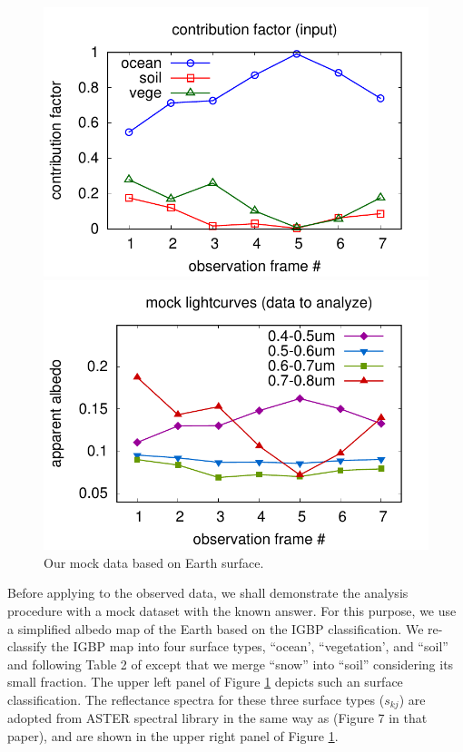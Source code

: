 \documentclass[iop,numberedappendix,apj,]{emulateapj}
\begin{document}
\begin{figure}[hb!]
\begin{minipage}{0.5\hsize}
\begin{center}
\includegraphics[width=\hsize]{mockdata_quadrature_factor.pdf}
    \end{center}
 \end{minipage}
   \begin{minipage}{0.5\hsize}
    \begin{center}
\includegraphics[width=\hsize]{mockdata_quadrature_lc.pdf}
    \end{center}
 \end{minipage}
    \caption{Our mock data based on Earth surface. }
\label{fig:mockdata}
\end{figure}

Before applying to the observed data, we shall demonstrate the analysis procedure with a mock dataset with the known answer. 
For this purpose, we use a simplified albedo map of the Earth based on the IGBP classification. 
We re-classify the IGBP map into four surface types, ``ocean', ``vegetation', and ``soil'' and following Table 2 of \citet{Fujii2010} except that we merge ``snow'' into ``soil'' considering its small fraction. 
The upper left panel of Figure \ref{fig:mockdata} depicts such an surface classification. 
The reflectance spectra for these three surface types ($s_{kj}$) are adopted from ASTER spectral library \citep{Baldridge2009} in the same way as \citet{Fujii2010} (Figure 7 in that paper), and are shown in the upper right panel of Figure \ref{fig:mockdata}. 
\end{document}
